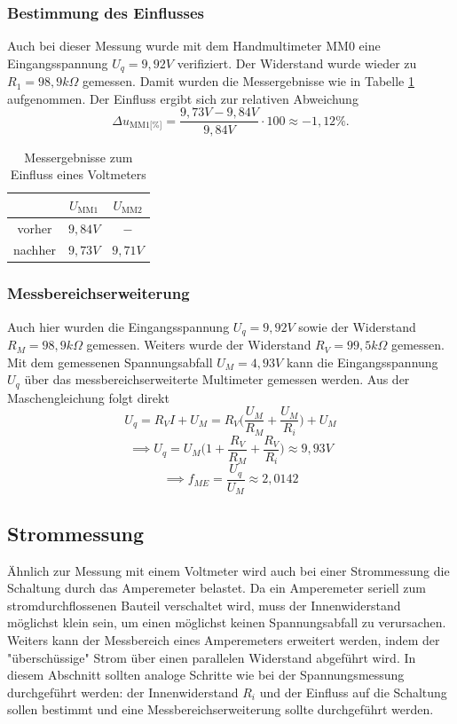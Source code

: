 \documentclass[a4paper]{article}
\begin{document}
\subsubsection*{\textbf{Bestimmung des Einflusses}}
Auch bei dieser Messung wurde mit dem Handmultimeter MM0 eine Eingangsspannung
$U_{q}=9,92V$ verifiziert. Der Widerstand wurde wieder zu $R_{1}=98,9 \unit{k\Omega}$ gemessen.
Damit wurden die Messergebnisse wie in Tabelle \ref{tab:1b_Ergebnisse} aufgenommen.
Der Einfluss ergibt sich zur relativen Abweichung
\[ \Delta u_\text{MM1[\%]} =
        \frac{9,73\unit{V} - 9,84\unit{V}}{9,84\unit{V}} \cdot 100
    \approx -1,12\% .\]
\begin{table}[h]
    \centering
    \caption{Messergebnisse zum Einfluss eines Voltmeters}
    \label{tab:1b_Ergebnisse}
    \begin{tabular}{|c|c|c|}
        \hline
         & $U_{\text{MM1}}$&  $U_{\text{MM2}}$\\ 
        \hline
        vorher &$9,84\unit{V}$& $-$\\
        \hline
        nachher &$9,73\unit{V}$& $9,71\unit{V}$\\
        \hline
    \end{tabular}
\end{table}

\subsubsection*{Messbereichserweiterung}
Auch hier wurden die Eingangsspannung $U_{q}=9,92\unit{V}$ sowie der Widerstand 
$R_{M}=98,9\unit{k\Omega}$ gemessen. Weiters wurde der Widerstand
$R_{V}=99,5\unit{k\Omega}$ gemessen. Mit dem gemessenen Spannungsabfall
$U_{M}=4,93\unit{V}$ kann die Eingangsspannung $U_{q}$ über das messbereichserweiterte
Multimeter gemessen werden.
Aus der Maschengleichung folgt direkt
\[ U_{q}=R_{V}I+U_{M} = R_{V} \bigg(\frac{U_{M}}{R_{M}} + \frac{U_{M}}{R_{i}}\bigg) + U_{M} \]
\[ \implies U_{q}=U_{M}\bigg(1+\frac{R_{V}}{R_{M}} + \frac{R_{V}}{R_{i}} \bigg)
\approx 9,93 \unit{V}\]
\[ \implies f_{ME}=\frac{U_{q}}{U_{M}}\approx  2,0142\]


\subsection{Strommessung}
Ähnlich zur Messung mit einem Voltmeter wird auch bei einer Strommessung die
Schaltung durch das Amperemeter belastet. Da ein Amperemeter seriell zum
stromdurchflossenen Bauteil verschaltet wird, muss der Innenwiderstand möglichst
klein sein, um einen möglichst keinen Spannungsabfall zu verursachen.
Weiters kann der Messbereich eines Amperemeters erweitert werden, indem der
"überschüssige" Strom über einen parallelen Widerstand abgeführt wird.\newline
In diesem Abschnitt sollten analoge Schritte wie bei der Spannungsmessung durchgeführt werden: 
der Innenwiderstand $R_{i}$ und der Einfluss auf die Schaltung sollen bestimmt 
und eine Messbereichserweiterung sollte durchgeführt werden.
\end{document}
